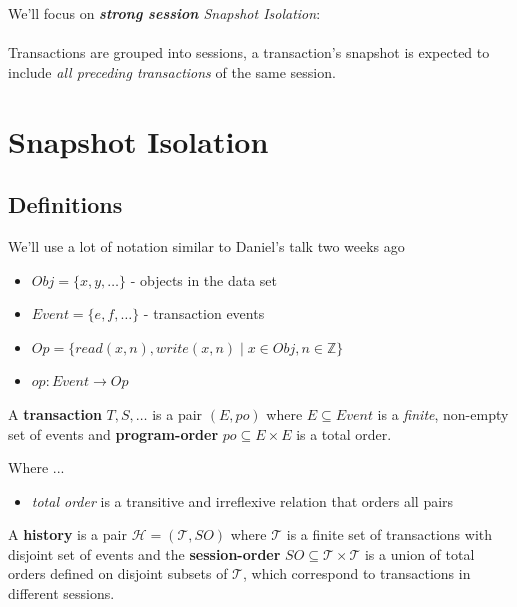 \documentclass{beamer}
\begin{document}
\begin{frame}
	We'll focus on \textit{\textbf{strong session} Snapshot Isolation}: \\ \hfill \\
	Transactions are grouped into sessions, a transaction's snapshot is expected to include \textit{all preceding transactions} of the same session.
\end{frame}

\section{Snapshot Isolation}
\subsection{Definitions}

\begin{frame}
	We'll use a lot of notation similar to Daniel's talk two weeks ago
	\begin{itemize}
		\item $ Obj =  \{ x, y, \dots \} $ - objects in the data set
		\item $ Event = \{ e, f, \dots \} $ - transaction events
		\item $ Op = \{ read(x,n), write(x, n) \mid x \in Obj, n \in \mathbb{Z}\} $ 
		\item $ op: Event \rightarrow Op $
	\end{itemize}
\end{frame}

\begin{frame}
	\begin{definition}
		A \textbf{transaction} $ T, S, \dots $ is a pair $ (E, po ) $ where $ E \subseteq Event $ is a \emph{finite}, non-empty set of events and \textbf{program-order} $ po \subseteq E \times E $ is a total order.
	\end{definition}
	Where ...
	\begin{itemize}
		\item \textit{total order} is a transitive and irreflexive relation that orders all pairs
	\end{itemize}
\end{frame}

\begin{frame}
	\begin{definition}
		A \textbf{history} is a pair $ \mathcal{H} = (\mathcal{T},SO) $ where $\mathcal{T}$ is a finite set of transactions with disjoint set of events and the \textbf{session-order} $ SO \subseteq \mathcal{T} \times \mathcal{T} $ is a union of total orders defined on disjoint subsets of $\mathcal{T}$, which correspond to transactions in different sessions.
	\end{definition}
\end{frame}
\end{document}
